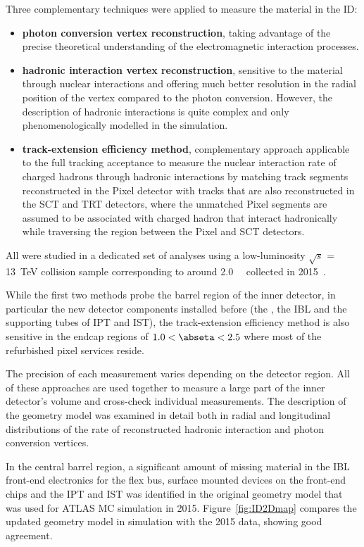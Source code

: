 \documentclass[cernpreprint, atlasdraft=false, UKenglish,british,orcidlogo, texmf, orcidlogo]{atlasdoc}
\begin{document}
Three complementary techniques were applied to measure the material in the \gls{ID}:
\begin{itemize}
\item \textbf{photon conversion vertex reconstruction}, taking advantage of the precise theoretical understanding of the electromagnetic interaction processes.
\item \textbf{hadronic interaction vertex reconstruction}, sensitive to the material through nuclear interactions and offering much better resolution in the radial position of the vertex compared to the photon conversion. However, the description of hadronic interactions is quite complex and only phenomenologically modelled in the simulation.
\item \textbf{track-extension efficiency method}, complementary approach applicable to the full tracking acceptance to measure the nuclear interaction rate of charged hadrons through hadronic interactions by matching track segments reconstructed in the Pixel detector with tracks that are also reconstructed in the \gls{SCT} and \gls{TRT} detectors, where the unmatched Pixel segments are assumed to be associated with charged hadron that interact hadronically while traversing the region between the Pixel and \gls{SCT} detectors.
\end{itemize}
All were studied in a dedicated set of analyses using a low-luminosity $\sqrt{s}$ = \SI{13}{\TeV} \pp collision sample corresponding to around \SI{2.0}{\per\nb} collected in 2015~\cite{PERF-2015-07}.
 
While the first two methods probe the barrel region of the inner detector, in particular the new detector components installed before \RunTwo (the \beampipe, the \gls{IBL} and the supporting tubes of \gls{IPT} and \gls{IST}), the track-extension efficiency method is also sensitive in the endcap regions of  $1.0 < \abseta < 2.5$ where most of the refurbished pixel services reside.
 
 
The precision of each measurement varies depending on the detector region.
All of these approaches are used together to measure a large part of the inner detector's volume and cross-check individual measurements.
The description of the geometry model was examined in detail both in radial and longitudinal distributions of the rate of reconstructed hadronic interaction and photon conversion vertices.
 
In the central barrel region, a significant amount of missing material in the \gls{IBL} front-end electronics for the flex bus, surface mounted
devices on the front-end chips and the \gls{IPT} and \gls{IST} was identified in the original geometry model that was used for ATLAS \gls{MC} simulation in 2015. Figure~\ref{fig:ID2Dmap} compares the updated geometry model in simulation with the 2015 data, showing good agreement.
 
\end{document}
